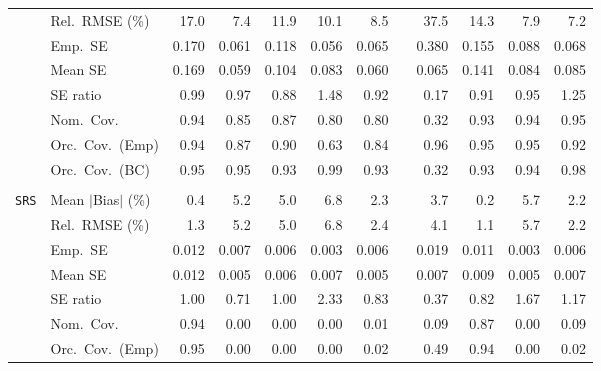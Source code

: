 \begin{landscape}
\begin{longtable}{llrrrrrrrrrr}
 & Rel.\ RMSE (\%) & 17.0 & \cellcolor{ranktwo}7.4 & 11.9 & 10.1 & 8.5 &  & 37.5 & 14.3 & \cellcolor{rankthree}7.9 & \cellcolor{rankone}7.2 \\
 & Emp.\ SE & 0.170 & 0.061 & 0.118 & 0.056 & 0.065 &  & 0.380 & 0.155 & 0.088 & 0.068 \\
 & Mean SE & 0.169 & 0.059 & 0.104 & 0.083 & 0.060 &  & 0.065 & 0.141 & 0.084 & 0.085 \\
 & SE ratio & \cellcolor{rankone}0.99 & \cellcolor{ranktwo}0.97 & 0.88 & 1.48 & 0.92 &  & 0.17 & 0.91 & \cellcolor{rankthree}0.95 & 1.25 \\
 & Nom.\ Cov. & \cellcolor{ranktwo}0.94 & 0.85 & 0.87 & 0.80 & 0.80 &  & 0.32 & \cellcolor{rankthree}0.93 & \cellcolor{ranktwo}0.94 & \cellcolor{rankone}0.95 \\
 & Orc.\ Cov.\ (Emp) & \cellcolor{ranktwo}0.94 & 0.87 & 0.90 & 0.63 & 0.84 &  & \cellcolor{ranktwo}0.96 & \cellcolor{rankone}0.95 & \cellcolor{rankone}0.95 & \cellcolor{rankthree}0.92 \\
 & Orc.\ Cov.\ (BC) & \cellcolor{rankone}0.95 & \cellcolor{rankone}0.95 & \cellcolor{rankthree}0.93 & 0.99 & \cellcolor{rankthree}0.93 &  & 0.32 & \cellcolor{rankthree}0.93 & \cellcolor{ranktwo}0.94 & 0.98 \\
\addlinespace[2pt]
\multicolumn{12}{l}{\textbf{Interaction}} \\
\addlinespace[2pt]
\quad \texttt{SRS} & Mean $|$Bias$|$ (\%) & \cellcolor{ranktwo}0.4 & 5.2 & 5.0 & 6.8 & 2.3 &  & 3.7 & \cellcolor{rankone}0.2 & 5.7 & \cellcolor{rankthree}2.2 \\
 & Rel.\ RMSE (\%) & \cellcolor{ranktwo}1.3 & 5.2 & 5.0 & 6.8 & 2.4 &  & 4.1 & \cellcolor{rankone}1.1 & 5.7 & \cellcolor{rankthree}2.2 \\
 & Emp.\ SE & 0.012 & 0.007 & 0.006 & 0.003 & 0.006 &  & 0.019 & 0.011 & 0.003 & 0.006 \\
 & Mean SE & 0.012 & 0.005 & 0.006 & 0.007 & 0.005 &  & 0.007 & 0.009 & 0.005 & 0.007 \\
 & SE ratio & \cellcolor{rankone}1.00 & 0.71 & \cellcolor{rankone}1.00 & 2.33 & \cellcolor{ranktwo}0.83 &  & 0.37 & \cellcolor{rankthree}0.82 & 1.67 & \cellcolor{ranktwo}1.17 \\
 & Nom.\ Cov. & \cellcolor{rankone}0.94 & 0.00 & 0.00 & 0.00 & 0.01 &  & \cellcolor{rankthree}0.09 & \cellcolor{ranktwo}0.87 & 0.00 & \cellcolor{rankthree}0.09 \\
 & Orc.\ Cov.\ (Emp) & \cellcolor{rankone}0.95 & 0.00 & 0.00 & 0.00 & 0.02 &  & \cellcolor{rankthree}0.49 & \cellcolor{ranktwo}0.94 & 0.00 & 0.02 \\

\end{longtable}
\end{landscape}
